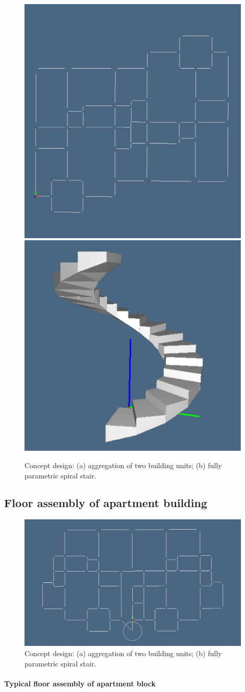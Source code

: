 \documentclass[11pt,oneside]{article}    %
\begin{document}
\begin{figure}[htbp] %
   \centering
   \includegraphics[width=0.33\linewidth]{images/planpair} 
   \includegraphics[width=0.3\linewidth]{images/spiralstair} 
   \caption{Concept design: (a) aggregation of two building units; (b) fully parametric spiral stair.}
   \label{fig:concept1}
\end{figure}

\subsection{Floor assembly of apartment building}

\begin{figure}[htbp] %
   \centering
   \includegraphics[width=0.6\linewidth]{images/plan2d} 
   \caption{Concept design: (a) aggregation of two building units; (b) fully parametric spiral stair.}
   \label{fig:concept1}
\end{figure}

\paragraph{Typical floor assembly of apartment block}
\end{document}
